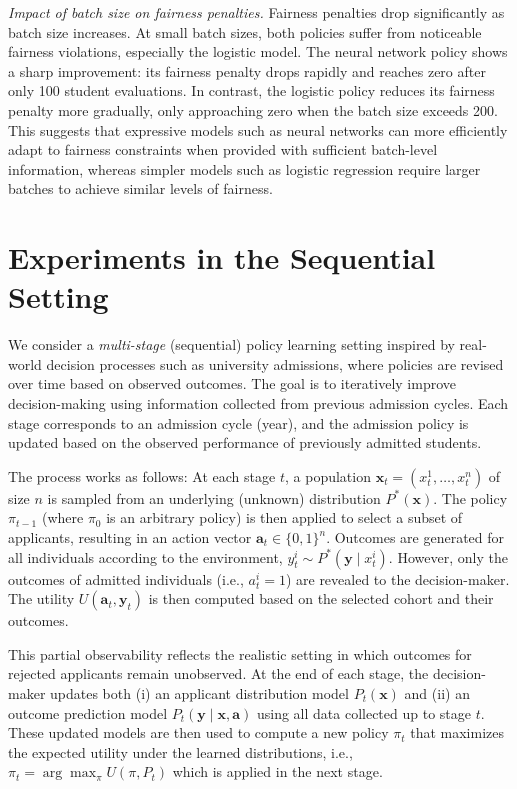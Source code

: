 \documentclass[acmlarge]{acmart-ecaf}
\newcommand {\Pfeat} {\mathbf{x}}
\newcommand {\Pact} {\mathbf{a}}
\newcommand {\Pout} {\mathbf{y}}
\begin{document}
\emph{Impact of batch size on fairness penalties.} Fairness penalties drop significantly as batch size increases. At small batch sizes, both policies suffer from noticeable fairness violations, especially the logistic model. The neural network policy shows a sharp improvement: its fairness penalty drops rapidly and reaches zero after only 100 student evaluations. In contrast, the logistic policy reduces its fairness penalty more gradually, only approaching zero when the batch size exceeds 200. This suggests that expressive models such as neural networks can more efficiently adapt to fairness constraints when provided with sufficient batch-level information, whereas simpler models such as logistic regression require larger batches to achieve similar levels of fairness.



\section{Experiments in the Sequential Setting} \label{mm}

We consider a \emph{multi-stage} (sequential) policy learning setting inspired by real-world decision processes such as university admissions, where policies are revised over time based on observed outcomes. The goal is to iteratively improve decision-making using information collected from previous admission cycles. Each stage corresponds to an admission cycle (year), and the admission policy is updated based on the observed performance of previously admitted students. 


The process works as follows: At each stage $t$, a
population $\Pfeat_t = (x_t^1, \ldots, x^n_t)$ of size $n$ is sampled from an underlying (unknown) distribution $P^*(\Pfeat)$. The policy $\pi_{t-1}$ (where $\pi_0$ is an arbitrary policy) is then applied to select a subset of applicants, resulting in an action vector $\Pact_t \in \{0,1\}^n$. Outcomes are generated for all individuals according to the environment, $y_t^i \sim P^*(\Pout \mid x_t^i)$. However, only the outcomes of admitted individuals
(i.e., $a_t^i = 1$) are revealed to the decision-maker. The utility $U(\Pact_t, \Pout_t)$ is then computed based on the selected cohort and their outcomes.


This partial observability reflects the realistic setting in which outcomes for rejected applicants remain unobserved. At the end of each stage, the decision-maker updates both (i) an applicant distribution model $P_t(\Pfeat)$ and (ii) an outcome prediction model $P_t(\Pout \mid \Pfeat, \Pact)$ using all data collected up to stage $t$. These updated models are then used to compute a new policy $\pi_t$ that maximizes the expected utility under the learned distributions, i.e.,
$
\pi_t = \arg\max_{\pi} U(\pi, P_t)
$ which is applied in the next stage.
\end{document}
